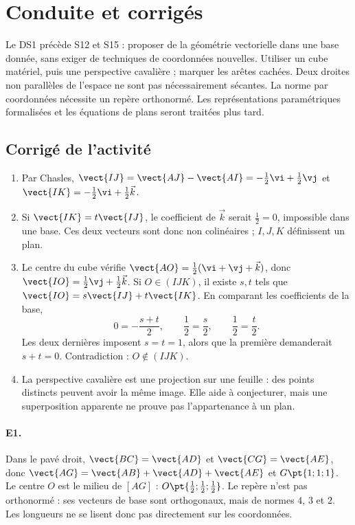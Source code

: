 \ifmxteacher\mxnewpage\section{Conduite et corrigés}\begin{teachernote}Le DS1 précède S12 et S15 : proposer de la géométrie vectorielle dans une base donnée, sans exiger de techniques de coordonnées nouvelles. Utiliser un cube matériel, puis une perspective cavalière ; marquer les arêtes cachées. Deux droites non parallèles de l'espace ne sont pas nécessairement sécantes. La norme par coordonnées nécessite un repère orthonormé. Les représentations paramétriques formalisées et les équations de plans seront traitées plus tard.\end{teachernote}

\subsection{Corrigé de l'activité}\begin{enumerate}
\item Par Chasles, $\vect{IJ}=\vect{AJ}-\vect{AI}=-\frac12\vi +\frac12\vj $ et $\vect{IK}=-\frac12\vi +\frac12\vec k$.
\item Si $\vect{IK}=t\vect{IJ}$, le coefficient de $\vec k$ serait $\frac{1}{2}=0$, impossible dans une base. Ces deux vecteurs sont donc non colinéaires ; $I,J,K$ définissent un plan.
\item Le centre du cube vérifie $\vect{AO}=\frac12(\vi +\vj +\vec k)$, donc $\vect{IO}=\frac12\vj +\frac12\vec k$. Si $O\in(IJK)$, il existe $s,t$ tels que $\vect{IO}=s\vect{IJ}+t\vect{IK}$. En comparant les coefficients de la base,
\[0=-\frac{s+t}2,\qquad \frac12=\frac s2,\qquad \frac12=\frac t2.\]
Les deux dernières imposent $s=t=1$, alors que la première demanderait $s+t=0$. Contradiction : $O\notin(IJK)$.
\item La perspective cavalière est une projection sur une feuille : des points distincts peuvent avoir la même image. Elle aide à conjecturer, mais une superposition apparente ne prouve pas l'appartenance à un plan.
\end{enumerate}

\paragraph{E1.}Dans le pavé droit, $\vect{BC}=\vect{AD}$ et $\vect{CG}=\vect{AE}$, donc $\vect{AG}=\vect{AB}+\vect{AD}+\vect{AE}$ et $G\pt{1;1;1}$. Le centre $O$ est le milieu de $[AG]$ : $O\pt{\frac12;\frac12;\frac12}$. Le repère n'est pas orthonormé : ses vecteurs de base sont orthogonaux, mais de normes $4$, $3$ et $2$. Les longueurs ne se lisent donc pas directement sur les coordonnées.

